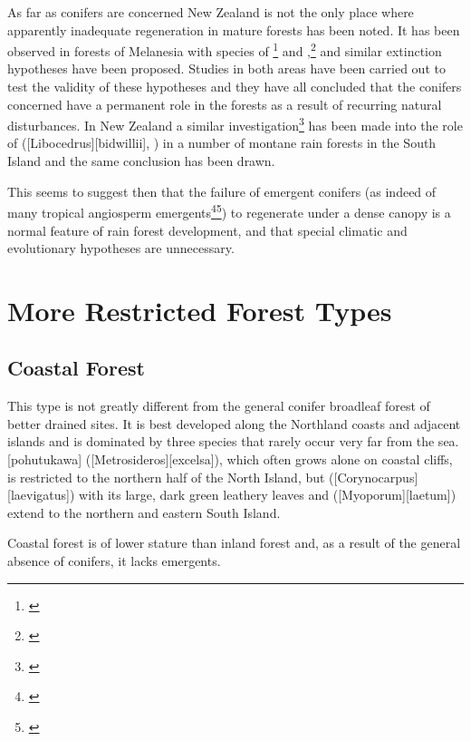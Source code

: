 As far as conifers are concerned New Zealand is not the only place where apparently inadequate regeneration in mature forests has been noted.
It has been observed in forests of Melanesia with species of \footnote{\cite{havel1971araucaria}} and ,\footnote{\cite{whitmore1966social}} and similar extinction hypotheses have been proposed.
Studies in both areas have been carried out to test the validity of these hypotheses and they have all concluded that the conifers concerned have a permanent role in the forests as a result of recurring natural disturbances.
In New Zealand a similar investigation\footnote{\cite{veblen1982conifer}} has been made into the role of  ([Libocedrus][bidwillii], ) in a number of montane rain forests in the South Island and the same conclusion has been drawn.

This seems to suggest then that the failure of emergent conifers (as indeed of many tropical angiosperm emergents\footnote{\cite{whitmore1975tropical}}\footnote{\cite{jones1956ecological}}) to regenerate under a dense canopy is a normal feature of rain forest development, and that special climatic and evolutionary hypotheses are unnecessary.

\section{More Restricted Forest Types}

\subsection{Coastal Forest}

This type is not greatly different from the general conifer broadleaf forest of better drained sites.
It is best developed along the Northland coasts and adjacent islands and is dominated by three species that rarely occur very far from the sea.
[pohutukawa] ([Metrosideros][excelsa]), which often grows alone on coastal cliffs, is restricted to the northern half of the North Island, but  ([Corynocarpus][laevigatus]) with its large, dark green leathery leaves and  ([Myoporum][laetum]) extend to the northern and eastern South Island.

Coastal forest is of lower stature than inland forest and, as a result of the general absence of conifers, it lacks emergents.

